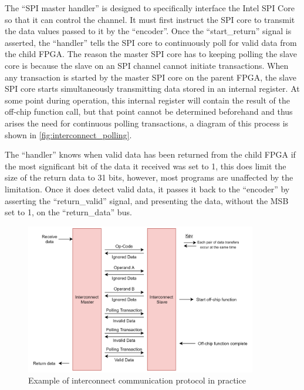 The “SPI master handler” is designed to specifically interface the Intel SPI Core so that it can control the channel. It must first instruct the SPI core to transmit the data values passed to it by the “encoder”. Once the “start\_return” signal is asserted, the “handler” tells the SPI core to continuously poll for valid data from the child FPGA. The reason the master SPI core has to keeping polling the slave core is because the slave on an SPI channel cannot initiate transactions. When any transaction is started by the master SPI core on the parent FPGA, the slave SPI core starts simultaneously transmitting data stored in an internal register. At some point during operation, this internal register will contain the result of the off-chip function call, but that point cannot be determined beforehand and thus arises the need for continuous polling transactions, a diagram of this process is shown in \autoref{fig:interconnect_polling}.

The “handler” knows when valid data has been returned from the child FPGA if the most significant bit of the data it received was set to 1, this does limit the size of the return data to 31 bits, however, most programs are unaffected by the limitation. Once it does detect valid data, it passes it back to the “encoder” by asserting the “return\_valid” signal, and presenting the data, without the MSB set to 1, on the “return\_data” bus. 

\begin{figure}[!htb]
    \centering
    \includegraphics[width=0.9\textwidth]{05_evaluation/images/interconnect_polling.png}
    \caption{Example of interconnect communication protocol in practice}
    \label{fig:interconnect_polling}
\end{figure}


